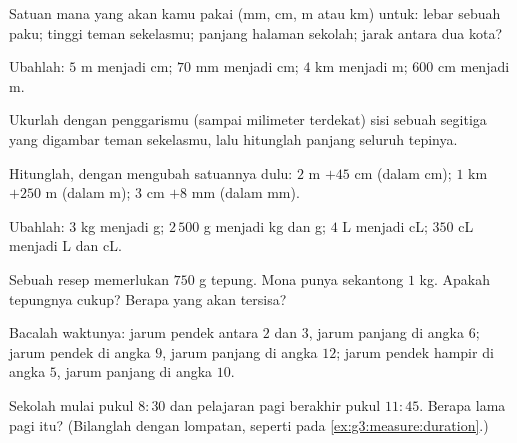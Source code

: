 \begin{exercise}[$\star$]\label{exo:g3:measure:1}
Satuan mana yang akan kamu pakai (mm, cm, m atau km) untuk: lebar
sebuah paku; tinggi teman sekelasmu; panjang halaman sekolah; jarak
antara dua kota?
\end{exercise}

\begin{exercise}[$\star$]\label{exo:g3:measure:2}
Ubahlah: $5$ m menjadi cm; \quad $70$ mm menjadi cm; \quad $4$ km
menjadi m; \quad $600$ cm menjadi m.
\end{exercise}

\begin{exercise}[$\star$]\label{exo:g3:measure:3}
Ukurlah dengan penggarismu (sampai milimeter terdekat) sisi sebuah
segitiga yang digambar teman sekelasmu, lalu hitunglah panjang
seluruh tepinya.
\end{exercise}

\begin{exercise}[$\star$]\label{exo:g3:measure:4}
Hitunglah, dengan mengubah satuannya dulu: $2$ m $+ 45$ cm (dalam cm);
\quad $1$ km $+ 250$ m (dalam m); \quad $3$ cm $+ 8$ mm (dalam mm).
\end{exercise}

\begin{exercise}[$\star$]\label{exo:g3:measure:5}
Ubahlah: $3$ kg menjadi g; \quad $2\,500$ g menjadi kg dan g; \quad
$4$ L menjadi cL; \quad $350$ cL menjadi L dan cL.
\end{exercise}

\begin{exercise}[$\star$]\label{exo:g3:measure:6}
Sebuah resep memerlukan $750$ g tepung. Mona punya sekantong $1$ kg.
Apakah tepungnya cukup? Berapa yang akan tersisa?
\end{exercise}

\begin{exercise}[$\star$]\label{exo:g3:measure:7}
Bacalah waktunya: jarum pendek antara $2$ dan $3$, jarum panjang di
angka $6$; jarum pendek di angka $9$, jarum panjang di angka $12$;
jarum pendek hampir di angka $5$, jarum panjang di angka $10$.
\end{exercise}

\begin{exercise}[$\star$]\label{exo:g3:measure:8}
Sekolah mulai pukul $8{:}30$ dan pelajaran pagi berakhir pukul
$11{:}45$. Berapa lama pagi itu? (Bilanglah dengan lompatan, seperti
pada \cref{ex:g3:measure:duration}.)
\end{exercise}

